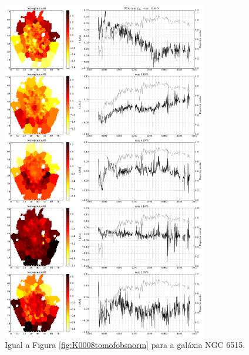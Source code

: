 \begin{figure}
    \includegraphics[width=0.8\textwidth]{figuras/K0864-tomo-obs-norm.pdf}
    \caption[Tomogramas de 1 a 5 para o cubo $f_{obs}$ - NGC 6515.]
    {Igual a Figura \ref{fig:K0008tomofobsnorm} para a galáxia NGC 6515.}
    \label{fig:K0864tomofobsnorm}
\end{figure}


